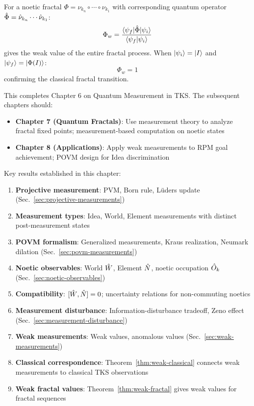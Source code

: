 \begin{theorem}
\label{thm:weak-fractal}
For a noetic fractal $\Phi = \nu_{k_n} \circ \cdots \circ \nu_{k_1}$ with corresponding quantum operator $\hat{\Phi} = \hat{\nu}_{k_n} \cdots \hat{\nu}_{k_1}$:
\[
\Phi_w = \frac{\langle \psi_f|\hat{\Phi}|\psi_i\rangle}{\langle\psi_f|\psi_i\rangle}
\]
gives the weak value of the entire fractal process. When $|\psi_i\rangle = |I\rangle$ and $|\psi_f\rangle = |\Phi(I)\rangle$:
\[
\Phi_w = 1
\]
confirming the classical fractal transition.
\end{theorem}

\begin{tcolorbox}[colback=green!5!white,colframe=green!50!black,title=\textbf{Handoff: Next Steps},breakable]
This completes Chapter 6 on Quantum Measurement in TKS. The subsequent chapters should:
\begin{itemize}
  \item \textbf{Chapter 7 (Quantum Fractals)}: Use measurement theory to analyze fractal fixed points; measurement-based computation on noetic states
  \item \textbf{Chapter 8 (Applications)}: Apply weak measurements to RPM goal achievement; POVM design for Idea discrimination
\end{itemize}

Key results established in this chapter:
\begin{enumerate}
  \item \textbf{Projective measurement}: PVM, Born rule, L\"uders update (Sec.~\ref{sec:projective-measurements})
  \item \textbf{Measurement types}: Idea, World, Element measurements with distinct post-measurement states
  \item \textbf{POVM formalism}: Generalized measurements, Kraus realization, Neumark dilation (Sec.~\ref{sec:povm-measurements})
  \item \textbf{Noetic observables}: World $\hat{W}$, Element $\hat{N}$, noetic occupation $\hat{O}_k$ (Sec.~\ref{sec:noetic-observables})
  \item \textbf{Compatibility}: $[\hat{W}, \hat{N}] = 0$; uncertainty relations for non-commuting noetics
  \item \textbf{Measurement disturbance}: Information-disturbance tradeoff, Zeno effect (Sec.~\ref{sec:measurement-disturbance})
  \item \textbf{Weak measurements}: Weak values, anomalous values (Sec.~\ref{sec:weak-measurements})
  \item \textbf{Classical correspondence}: Theorem~\ref{thm:weak-classical} connects weak measurements to classical TKS observations
  \item \textbf{Weak fractal values}: Theorem~\ref{thm:weak-fractal} gives weak values for fractal sequences
\end{enumerate}


\end{tcolorbox}
